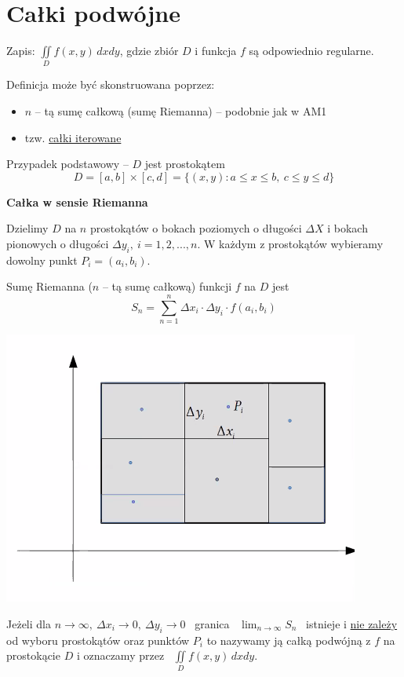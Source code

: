 \section{Całki podwójne}

Zapis: $ \iint\limits_{D} f(x,y)\, dxdy $, gdzie zbiór $D$ i funkcja $f$ są odpowiednio regularne.

Definicja może być skonstruowana poprzez:
\begin{itemize}
    \item $n$ -- tą sumę całkową (sumę Riemanna) -- podobnie jak w AM1
    \item tzw. \underline{całki iterowane}
\end{itemize}
\bigskip

Przypadek podstawowy -- $D$ jest prostokątem
\[ D = [a,b] \times [c,d] = \{ (x,y): a \leq x \leq b, \ c \leq y \leq d \} \]
\medskip

\textbf{Całka w sensie Riemanna}

Dzielimy $D$ na $n$ prostokątów o bokach poziomych o długości $\Delta X$ i bokach pionowych o długości $\Delta y_i, \ i = 1,2,...,n$.
W każdym z prostokątów wybieramy dowolny punkt $P_i = (a_i, b_i)$.

Sumę Riemanna ($n$ -- tą sumę całkową) funkcji $f$ na $D$ jest
\[ S_n = \sum\limits_{n=1}^{n} \Delta x_i \cdot \Delta y_i \cdot f(a_i, b_i) \]

\begin{center}
    \includegraphics[scale=0.8]{img/prostokat1.png}
\end{center}

Jeżeli dla $ n \to \infty, \ \Delta x_i \to 0, \ \Delta y_i \to 0 $ \ granica \ $ \lim_{n \to \infty} S_n $ \ istnieje i \underline{nie zależy}
od wyboru prostokątów oraz punktów $P_i$ to nazywamy ją całką podwójną z $f$ na prostokącie $D$ i oznaczamy przez \ $ \iint\limits_D f(x,y) \, dxdy $.
\bigskip

